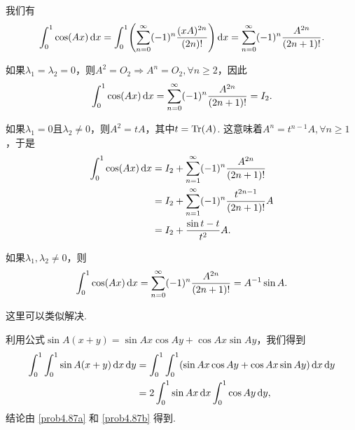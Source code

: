 \begin{solution}
  \begin{inparaenum}[(a)]
    \item 我们有
    \[
      \int_0^1\cos(Ax) \dif x = \int_0^1\left(
        \sum_{n=0}^\infty (-1)^n \frac{(xA)^{2n}}{(2n)!}
      \right)\dif x = \sum_{n=0}^\infty (-1)^n \frac{A^{2n}}{(2n+1)!}.
    \]

    如果$\lambda_1=\lambda_2=0$，则$A^2=O_2\Rightarrow
        A^n=O_2,\forall n\ge2$，因此
    \[
      \int_0^1\cos(Ax) \mathop{}\!\mathrm d x = \sum_{n=0}^\infty (-1)^n \frac{A^{2n}}{(2n+1)!} = I_2.
    \]

    如果$\lambda_1=0$且$\lambda_2\ne0$，则$A^2=tA$，其中$t=\operatorname{Tr}(A)$. 这意味着$A^n=t^{n-1}A,\forall n\ge1$，于是
    \begin{align*}
      \int_0^1 \cos(Ax) \mathop{}\!\mathrm d x & = I_2 + \sum_{n=1}^\infty(-1)^n\frac{A^{2n}}{(2n+1)!} \\
      & = I_2 + \sum_{n=1}^\infty(-1)^n\frac{t^{2n-1}}{(2n+1)!}A \\
      & = I_2 + \frac{\sin t-t}{t^2}A.
    \end{align*}

    如果$\lambda_1,\lambda_2\ne0$，则
    \[
      \int_0^1\cos(Ax) \mathop{}\!\mathrm d x = \sum_{n=0}^\infty (-1)^n \frac{A^{2n}}{(2n+1)!} =A^{-1}\sin A.
    \]

    \item 这里可以类似解决.

    \item 利用公式$\sin A(x+y)=\sin Ax\cos Ay+\cos Ax\sin Ay$，我们得到
        \begin{align*}
          \int_0^1\int_0^1\sin A(x+y)\mathop{}\!\mathrm d x\mathop{}\!\mathrm d y & = \int_0^1\int_0^1(\sin Ax\cos Ay+\cos Ax\sin Ay)\mathop{}\!\mathrm d x\mathop{}\!\mathrm d y \\
          & = 2\int_0^1\sin Ax\mathop{}\!\mathrm d x \int_0^1\cos Ay \mathop{}\!\mathrm d y,
        \end{align*}
    结论由 \ref{prob4.87a} 和 \ref{prob4.87b} 得到.
  \end{inparaenum}
\end{solution}

\setcounter{solution}{88}

